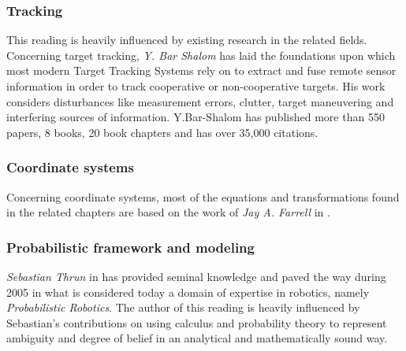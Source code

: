 \subsubsection{Tracking}
This reading is heavily influenced by existing research in the related fields. Concerning target tracking,  \emph{Y. Bar Shalom} \Cite{BarShalom1980,Shalom1990,Shalom2001} has laid the foundations upon which most modern Target Tracking Systems rely on to extract and fuse remote sensor information in order to track cooperative or non-cooperative targets. His work considers disturbances like measurement errors, clutter, target maneuvering and interfering sources of information.  Y.Bar-Shalom has published more than 550 papers, 8 books, 20 book chapters and has over 35,000 citations. \\
\subsubsection{Coordinate systems}
Concerning coordinate systems, most of the equations and transformations found in the related chapters are based on the work of \emph{Jay A. Farrell} in \cite{Farrell2008}.\\

\subsubsection{Probabilistic framework and modeling}
\emph{Sebastian Thrun} in \cite{Thrun2005} has provided seminal knowledge and paved the way during 2005 in what is considered today a domain of expertise in robotics, namely \emph{Probabilistic Robotics}. The author of this reading is heavily influenced by Sebastian's contributions on using calculus and probability theory to represent ambiguity and degree of belief in an analytical and mathematically sound way. 


